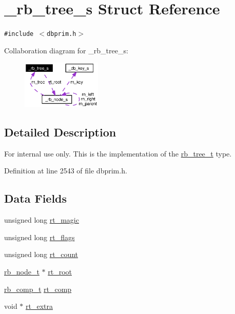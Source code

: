 \hypertarget{struct__rb__tree__s}{
\section{\_\-rb\_\-tree\_\-s Struct Reference}
\label{struct__rb__tree__s}
}
{\tt \#include $<$dbprim.h$>$}

Collaboration diagram for \_\-rb\_\-tree\_\-s:\begin{figure}[H]
\begin{center}
\leavevmode
\includegraphics[width=107pt]{struct__rb__tree__s__coll__graph}
\end{center}
\end{figure}


\subsection{Detailed Description}
\begin{Desc}
\item[For internal use only.]
This is the implementation of the \hyperlink{group__dbprim__rbtree_ga0}{rb\_\-tree\_\-t} type.\end{Desc}




Definition at line 2543 of file dbprim.h.\subsection*{Data Fields}
\begin{CompactItemize}
\item 
unsigned long \hyperlink{struct__rb__tree__s_o0}{rt\_\-magic}
\item 
unsigned long \hyperlink{struct__rb__tree__s_o1}{rt\_\-flags}
\item 
unsigned long \hyperlink{struct__rb__tree__s_o2}{rt\_\-count}
\item 
\hyperlink{struct__rb__node__s}{rb\_\-node\_\-t} $\ast$ \hyperlink{struct__rb__tree__s_o3}{rt\_\-root}
\item 
\hyperlink{group__dbprim__rbtree_ga3}{rb\_\-comp\_\-t} \hyperlink{struct__rb__tree__s_o4}{rt\_\-comp}
\item 
void $\ast$ \hyperlink{struct__rb__tree__s_o5}{rt\_\-extra}
\end{CompactItemize}


